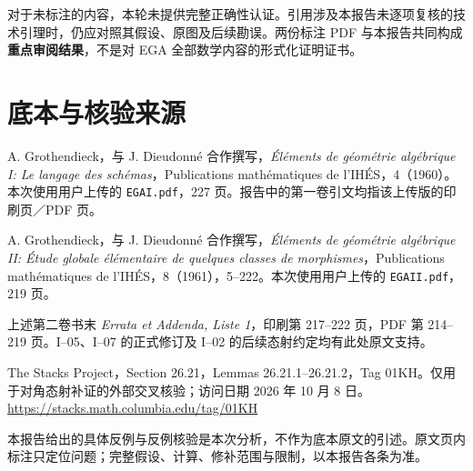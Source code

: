 \documentclass[UTF8,a4paper]{ctexbook}
\begin{document}
对于未标注的内容，本轮未提供完整正确性认证。引用涉及本报告未逐项复核的技术引理时，仍应对照其假设、原图及后续勘误。两份标注 PDF 与本报告共同构成\textbf{重点审阅结果}，不是对 EGA 全部数学内容的形式化证明证书。


\chapter{底本与核验来源}
\begin{enumerate}[label={[\arabic*]},leftmargin=3em]
\item A. Grothendieck，与 J. Dieudonn\'e 合作撰写，\emph{Éléments de géométrie algébrique I: Le langage des schémas}，Publications mathématiques de l'IHÉS，4（1960）。本次使用用户上传的 \texttt{EGAI.pdf}，227 页。报告中的第一卷引文均指该上传版的印刷页／PDF 页。
\item A. Grothendieck，与 J. Dieudonn\'e 合作撰写，\emph{Éléments de géométrie algébrique II: Étude globale élémentaire de quelques classes de morphismes}，Publications mathématiques de l'IHÉS，8（1961），5--222。本次使用用户上传的 \texttt{EGAII.pdf}，219 页。
\item 上述第二卷书末 \emph{Errata et Addenda, Liste 1}，印刷第 217--222 页，PDF 第 214--219 页。I--05、I--07 的正式修订及 I--02 的后续态射约定均有此处原文支持。
\item The Stacks Project，Section 26.21，Lemmas 26.21.1--26.21.2，Tag 01KH。仅用于对角态射补证的外部交叉核验；访问日期 2026 年 10 月 8 日。\url{https://stacks.math.columbia.edu/tag/01KH}
\end{enumerate}
\par\bigskip
本报告给出的具体反例与反例核验是本次分析，不作为底本原文的引述。原文页内标注只定位问题；完整假设、计算、修补范围与限制，以本报告各条为准。
\end{document}
